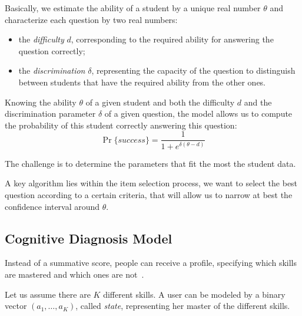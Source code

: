 \documentclass{sig-alternate}
\begin{document}

Basically, we estimate the ability of a student by a unique real number $\theta$ and characterize each question by two real numbers:

\begin{itemize}
\item the \emph{difficulty} $d$, corresponding to the required ability for answering the question correctly; %
\item the \emph{discrimination} $\delta$, representing the capacity of the question to distinguish between students that have the required ability from the other ones.
\end{itemize}

Knowing the ability $\theta$ of a given student and both the difficulty $d$ and the discrimination parameter $\delta$ of a given question, the model allows us to compute the probability of this student correctly answering this question:
\[ \Pr\{success\} = \frac1{1+e^{\delta(\theta - d)}} \]

The challenge is to determine the parameters that fit the most the student data.



A key algorithm lies within the item selection process, we want to select the best question according to a certain criteria, that will allow us to narrow at best the confidence interval around $\theta$.


\subsection{Cognitive Diagnosis Model}


Instead of a summative score, people can receive a profile, specifying which skills are mastered and which ones are not~\cite{Cheng2009}. %

Let us assume there are $K$ different skills. A user can be modeled by a binary vector $(a_1, \ldots, a_K)$, called \emph{state}, representing her master of the different skills. %
\end{document}

